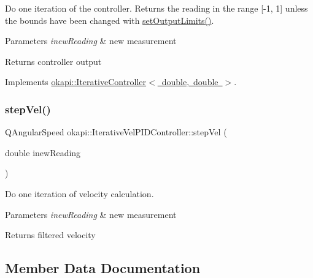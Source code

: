 Do one iteration of the controller. Returns the reading in the range \mbox{[}-\/1, 1\mbox{]} unless the bounds have been changed with \mbox{\hyperlink{classokapi_1_1IterativeVelPIDController_a02efd865f97b0f2da3f826c1120ec07b}{set\+Output\+Limits()}}.


\begin{DoxyParams}{Parameters}
{\em inew\+Reading} & new measurement \\
\hline
\end{DoxyParams}
\begin{DoxyReturn}{Returns}
controller output 
\end{DoxyReturn}


Implements \mbox{\hyperlink{classokapi_1_1IterativeController_a751bcad1407099e629e3ffbe395daf2b}{okapi\+::\+Iterative\+Controller$<$ double, double $>$}}.

\mbox{\label{classokapi_1_1IterativeVelPIDController_a61f240eba6823d4174f2d7cc4b524239}} 
\subsubsection{\texorpdfstring{stepVel()}{stepVel()}}
{\footnotesize\ttfamily Q\+Angular\+Speed okapi\+::\+Iterative\+Vel\+P\+I\+D\+Controller\+::step\+Vel (\begin{DoxyParamCaption}\item[{double}]{inew\+Reading }\end{DoxyParamCaption})\hspace{0.3cm}{\ttfamily [virtual]}}

Do one iteration of velocity calculation.


\begin{DoxyParams}{Parameters}
{\em inew\+Reading} & new measurement \\
\hline
\end{DoxyParams}
\begin{DoxyReturn}{Returns}
filtered velocity 
\end{DoxyReturn}


\subsection{Member Data Documentation}
\mbox{\label{classokapi_1_1IterativeVelPIDController_a0732ec5a765af01af100370d54754fc4}} 
